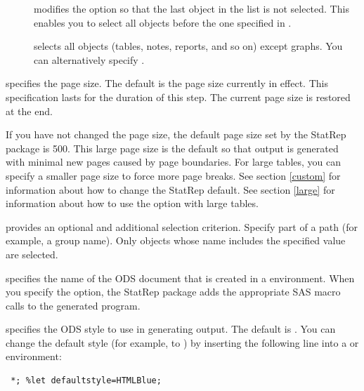 \documentclass[article,oneside]{memoir}
\newcommand*{\StatRep}{\textsf{StatRep}\xspace}
\begin{document}
\begin{description}
\begin{description}
  \item[] modifies the  option so that the last object
  in the list is not selected. This enables you to select all objects before
  the one specified in .\label{skiplast}

  \item[] selects all objects
  (tables, notes, reports, and so on) except graphs. You can
  alternatively specify .

  \end{description}

  \item[\Code{pagesize=}] specifies the page size. The default is the page size currently in effect.
  This specification lasts for the
  duration of this step. The current page size is restored at the end.

  If you have not changed the page size, the default page size set by the \StatRep
  package is 500. This large page size is the default so that output is generated with
  minimal new pages caused by page boundaries. For large tables, you can specify a smaller
  page size to force more page breaks. See section \ref{custom} for information about
  how to change the \StatRep default. See section \ref{large} for information about how
  to use the  option with large tables.

  \item[\Code{pattern=}] provides an optional and additional selection criterion.
  Specify part of a path (for example, a group name).
  Only objects whose name includes the specified value are selected.

    \item[\Code{store=}] specifies the name of the ODS document that is created in a
      environment. When you specify the  option,
     the \StatRep package adds the appropriate SAS macro calls to the
     generated program.

  \item[\Code{style=}] specifies the ODS style to use in generating output.
    The default is \mbox{}. You can change the default style
    (for example, to ) by inserting the following line into a 
    or  environment:

\begin{snugshade}
\begin{verbatim}
 *; %let defaultstyle=HTMLBlue;
\end{verbatim}
\end{snugshade}


\end{description}
\end{document}

